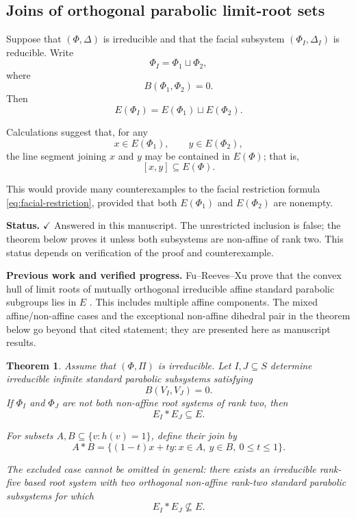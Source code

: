 \documentclass[11pt,reqno]{amsart}
\theoremstyle{plain}
\newtheorem{theorem}{Theorem}[section]
\theoremstyle{definition}
\theoremstyle{remark}
\numberwithin{equation}{section}
\begin{document}
\subsection{Joins of orthogonal parabolic limit-root sets}

Suppose that $(\Phi,\Delta)$ is irreducible and that
the facial subsystem $(\Phi_I,\Delta_I)$ is reducible.
Write
\[
\Phi_I=\Phi_1\sqcup\Phi_2,
\]
where
\[
B(\Phi_1,\Phi_2)=0.
\]
Then
\[
E(\Phi_I)=E(\Phi_1)\sqcup E(\Phi_2).
\]

Calculations suggest that, for any
\[
x\in E(\Phi_1),
\qquad
y\in E(\Phi_2),
\]
the line segment joining $x$ and $y$ may be contained
in $E(\Phi)$; that is,
\[
\boxed{
[x,y]\subseteq E(\Phi).
}
\]

This would provide many counterexamples to the facial
restriction formula \eqref{eq:facial-restriction}, provided that both
$E(\Phi_1)$ and $E(\Phi_2)$ are nonempty.


\par\medskip
\noindent\textbf{Status.} \(\checkmark\) Answered in this manuscript. The unrestricted inclusion is false; the theorem below proves it unless both subsystems are non-affine of rank two. This status depends on verification of the proof and counterexample.

\par\medskip
\noindent\textbf{Previous work and verified progress.}
Fu--Reeves--Xu prove that the convex hull of limit roots of mutually
orthogonal irreducible affine standard parabolic subgroups lies in $E$
\cite[Proposition~5.30]{FRX2026}. This includes multiple affine components.
The mixed affine/non-affine cases and the exceptional non-affine dihedral
pair in the theorem below go beyond that cited statement; they are
presented here as manuscript results.

\begin{theorem}\label{thm:orthogonal-parabolic-join}
Assume that $(\Phi,\Pi)$ is irreducible. Let $I,J\subseteq S$
determine irreducible infinite standard parabolic subsystems
satisfying
\[
B(V_I,V_J)=0.
\]
If $\Phi_I$ and $\Phi_J$ are not both non-affine root systems of
rank two, then
\[
E_I*E_J\subseteq E.
\]

For subsets $A,B\subseteq\{v:h(v)=1\}$, define their join by
\[
A*B
=
\{(1-t)x+ty:x\in A,\ y\in B,\ 0\le t\le1\}.
\]

The excluded case cannot be omitted in general: there exists an
irreducible rank-five based root system with two orthogonal
non-affine rank-two standard parabolic subsystems for which
\[
E_I*E_J\not\subseteq E.
\]
\end{theorem}
\end{document}
